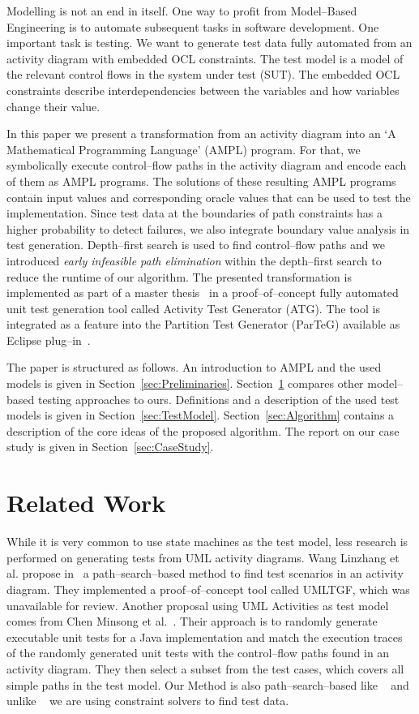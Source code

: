 \documentclass[runningheads,a4paper]{llncs}%
\begin{document}
Modelling is not an end in itself.
One way to profit from Model--Based Engineering is to automate subsequent tasks
in software development. One important task is testing. We want to generate test
data fully automated from an activity diagram with embedded OCL constraints. The
test model is a model of the relevant control flows in the system under test
(SUT). The embedded OCL constraints describe interdependencies between the
variables and how variables change their value.

In this paper we present a transformation from an activity diagram into an `A
Mathematical Programming Language' (AMPL) program. For that, we symbolically
execute control--flow paths in the activity diagram and encode each of them as
AMPL programs. The solutions of these resulting AMPL programs contain input
values and corresponding oracle values that can be used to test the
implementation. Since test data at the boundaries of path constraints has a
higher probability to detect failures, we also integrate boundary value analysis
in test generation. Depth--first search is used to find control--flow paths and
we introduced \emph{early infeasible path elimination} within the depth--first
search to reduce the runtime of our algorithm. The presented transformation is
implemented as part of a master thesis~\cite{Kurth2014AutomatedGen} in a
proof--of--concept fully automated unit test generation tool called Activity
Test Generator (ATG). The tool is integrated as a feature into the Partition
Test Generator (ParTeG) available as Eclipse plug--in~\cite{PartegWebsite}.

The paper is structured as follows. An introduction to AMPL and the used models
is given in Section~\ref{sec:Preliminaries}. Section~\ref{sec:LiteratureReview}
compares other model--based testing approaches to ours. Definitions and a
description of the used test models is given in Section~\ref{sec:TestModel}.
Section~\ref{sec:Algorithm} contains a description of the core ideas of the
proposed algorithm. The report on our case study is given in
Section~\ref{sec:CaseStudy}.
\section{Related Work}%
\label{sec:LiteratureReview}%
While it is very common to use state machines as the test model, less research
is performed on generating tests from UML activity diagrams. Wang Linzhang et
al. propose in~\cite{Linzhang04GeneratingTestCasefromActivityGrayBoxMethod} a
path--search--based method to find test scenarios in an activity diagram.
They implemented a proof--of--concept tool called UMLTGF, which was unavailable
for review. Another proposal using UML Activities as test model comes from Chen
Minsong et al.~\cite{mingsong2006automatic}. Their approach is to randomly
generate executable unit tests for a Java implementation and match the execution
traces of the randomly generated unit tests with the control--flow paths found
in an activity diagram. They then select a subset from the test cases, which
covers all simple paths in the test model. Our Method is also
path--search--based like
~\cite{Linzhang04GeneratingTestCasefromActivityGrayBoxMethod} and unlike
~\cite{mingsong2006automatic} we are using constraint solvers to find test data.
\end{document}
